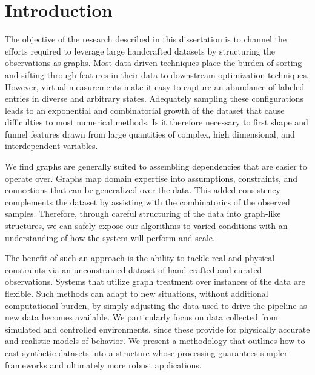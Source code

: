 \documentclass[12pt]{report}
\begin{document}
\chapter{Introduction}\label{intro}
\vspace{-9mm}
The objective of the research described in this dissertation is to
channel the efforts required to leverage 
large handcrafted datasets by
structuring the observations as graphs.
Most data-driven techniques place the burden of sorting and sifting through
features in their data to downstream optimization techniques.
However, virtual measurements make it easy to capture an abundance of labeled entries
in diverse and arbitrary states.
Adequately sampling these configurations leads to an exponential and combinatorial growth 
of the dataset that cause difficulties to most numerical methods.
Is it therefore necessary to first shape and funnel features drawn from large quantities of complex, 
high dimensional, and interdependent variables.

We find graphs are generally suited to assembling dependencies that are easier to operate over.
Graphs map domain expertise into assumptions, 
constraints, and connections that can be generalized over the data.
This added consistency complements the dataset 
by assisting with the combinatorics of the observed samples.
Therefore, through careful structuring of the data into graph-like structures, 
we can safely expose our algorithms to varied conditions with an understanding of how the system 
will perform and scale.

The benefit of such an approach is the ability to tackle real and physical constraints via
an unconstrained dataset of hand-crafted and curated observations. 
Systems that utilize graph treatment over instances of the data are flexible.
Such methods can adapt to new situations, without additional computational burden, 
by simply adjusting the data used to drive the pipeline as new data becomes available. 
We particularly focus on data collected from simulated and controlled environments, 
since these provide for physically accurate and realistic models of behavior. 
We present a methodology that outlines how to cast synthetic datasets into a structure 
whose processing guarantees simpler frameworks and ultimately more robust applications. 
\end{document}
